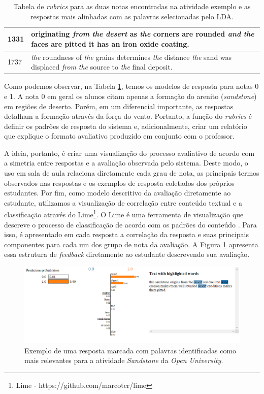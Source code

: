 \begin{table}
\begin{minipage}[t]{.45\textwidth}
\begin{tabular}{ p{1.5cm} | p{5cm} }
1331 & originating \textit{from} \textit{the} \textit{desert} as \textit{the} corners are rounded \textit{and} \textit{the} faces are pitted it has an iron oxide coating.\\ \hline
1737 & \textit{the} roundness of \textit{the} grains determines \textit{the} distance \textit{the} sand was displaced \textit{from} \textit{the} source to \textit{the} final deposit.\\ \hline
\hline
\end{tabular}
\end{minipage}
\caption{Tabela de \textit{rubrics} para as duas notas encontradas na atividade exemplo e as respostas mais alinhadas com as palavras selecionadas pelo LDA.}
\label{tab-rubrics-exemplo}
\end{table}

Como podemos observar, na Tabela \ref{tab-rubrics-exemplo}, temos os modelos de resposta para notas 0 e 1. A nota 0 em geral os alunos citam apenas a formação do arenito (\textit{sandstone}) em regiões de deserto. Porém, em um diferencial importante, as respostas detalham a formação através da força do vento. Portanto, a função do \textit{rubrics} é definir os padrões de resposta do sistema e, adicionalmente, criar um relatório que explique o formato avaliativo produzido em conjunto com o professor.

A ideia, portanto, é criar uma visualização do processo avaliativo de acordo com a simetria entre respostas e a avaliação observada pelo sistema. Deste modo, o uso em sala de aula relaciona diretamente cada grau de nota, as principais termos observados nas respostas e os exemplos de resposta coletados dos próprios estudantes. Por fim, como modelo descritivo da avaliação diretamente ao estudante, utilizamos a visualização de correlação entre conteúdo textual e a classificação através do Lime\footnote{Lime - https://github.com/marcotcr/lime}. O Lime é uma ferramenta de visualização que descreve o processo de classificação de acordo com os padrões do conteúdo \cite{ribeiro2016}. Para isso, é apresentado em cada resposta a correlação da resposta e suas principais componentes para cada um dos grupo de nota da avaliação. A Figura \ref{fig-lime-exemplo} apresenta essa estrutura de \textit{feedback} diretamente ao estudante descrevendo sua avaliação.

\begin{figure}[!h]
\centering
\includegraphics[width=\textwidth]{figuras/exemplo/exemplo-lime}
\caption{Exemplo de uma resposta marcada com palavras identificadas como mais relevantes para a atividade \textit{Sandstone} da \textit{Open University}.}
\label{fig-lime-exemplo}
\end{figure}

